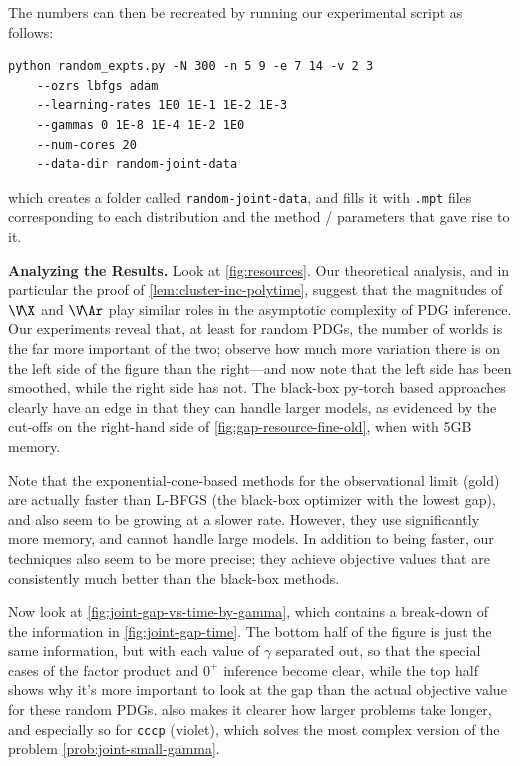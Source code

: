 The numbers can then be recreated by running our experimental script as follows:
\begin{verbatim}
python random_expts.py -N 300 -n 5 9 -e 7 14 -v 2 3
    --ozrs lbfgs adam
    --learning-rates 1E0 1E-1 1E-2 1E-3
    --gammas 0 1E-8 1E-4 1E-2 1E0
    --num-cores 20
    --data-dir random-joint-data
\end{verbatim}
which creates a folder called \verb|random-joint-data|,
and fills it with \verb|.mpt| files corresponding to each distribution
and the method / parameters that gave rise to it. 

\textbf{Analyzing the Results.}
Look at  \cref{fig:resources}.  Our theoretical analysis, and in particular the proof of \cref{lem:cluster-inc-polytime}, suggest that the magnitudes of $\V\!\X$ and $\V\!\Ar$ play similar roles in the asymptotic complexity of PDG inference. 
Our experiments reveal that, at least for random PDGs, the number of worlds is the far more important of the two; observe how much more variation there is on the left side of the figure than the right---and now note that the left side has been smoothed, while the right side has not.
The black-box py-torch based approaches clearly have an edge in that they can handle larger models, as evidenced by the cut-offs on the right-hand side of \cref{fig:gap-resource-fine-old}, when with 5GB memory.

Note that the exponential-cone-based methods for the observational limit (gold) are actually faster than L-BFGS (the black-box optimizer with the lowest gap), and also seem to be growing at a slower rate.
However, they use significantly more memory, and cannot handle large models.
In addition to being faster, our techniques also seem to be more precise; they achieve objective values that are consistently much better than the black-box methods.


Now look at \cref{fig:joint-gap-vs-time-by-gamma},
which contains a break-down of the information in \cref{fig:joint-gap-time}. The bottom half of the figure is just the same information, but with each value of $\gamma$ separated out, so that the special cases of the factor product and $0^+$ inference become clear, while the top half shows why it's more important to look at the gap than the actual objective value for these random PDGs. 
 also makes it clearer how larger problems take longer, and especially so for \texttt{cccp} (violet), which solves the most complex version of the problem \eqref{prob:joint-small-gamma}.

